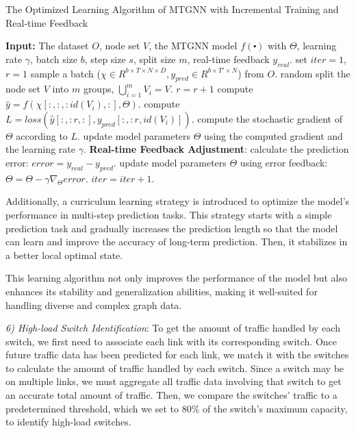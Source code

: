 \documentclass[journal]{IEEEtran}
\begin{document}
\begin{algorithm}
\caption{The Optimized Learning Algorithm of MTGNN with Incremental Training and Real-time Feedback}
\label{alg1}
\begin{algorithmic}[1] 
\small  
\STATE \textbf{Input:} The dataset $O$, node set $V$, the MTGNN model $f\left( \centerdot  \right)$ with $\Theta $, learning rate $\gamma $, batch size $b$, step size $s$, split size $m$, real-time feedback $y_{real}$.
\STATE set $iter=1$, $r=1$
    \STATE sample a batch ($\chi \in {{R}^{b \times T \times N \times D}}, y_{pred} \in {{R}^{b \times T' \times N}}$) from $O$.
    \STATE random split the node set $V$ into $m$ groups, $\bigcup\nolimits_{i=1}^{m}{{{V}_{i}}=V}$.
        \STATE $r = r + 1$
    \ENDIF
        \STATE compute $\hat{y} = f(\chi[:,:,:id({V}_{i}),:], \Theta)$.
        \STATE compute $L = loss(\hat{y}[:, :r, :], y_{pred}[:,:r, id({V}_{i})])$.
        \STATE compute the stochastic gradient of $\Theta$ according to $L$.
        \STATE update model parameters $\Theta$ using the computed gradient and the learning rate $\gamma$.
        \ENDFOR
    \STATE \textbf{Real-time Feedback Adjustment}:  
        \STATE calculate the prediction error: $error = y_{real} - y_{pred}$.
        \STATE update model parameters $\Theta$ using error feedback: $\Theta = \Theta - \gamma \nabla_{\Theta} error$.
    \ENDIF
    \STATE $iter = iter + 1$.
\ENDWHILE
\end{algorithmic}
\end{algorithm}


Additionally, a curriculum learning strategy is introduced to optimize the model's performance in multi-step prediction tasks. This strategy starts with a simple prediction task and gradually increases the prediction length so that the model can learn and improve the accuracy of long-term prediction. Then, it stabilizes in a better local optimal state. 

This learning algorithm not only improves the performance of the model but also enhances its stability and generalization abilities, making it well-suited for handling diverse and complex graph data.



\emph{6) High-load Switch Identification}: To get the amount of traffic handled by each switch, we first need to associate each link with its corresponding switch.       
Once future traffic data has been predicted for each link, we match it with the switches to calculate the amount of traffic handled by each switch.       
Since a switch may be on multiple links, we must aggregate all traffic data involving that switch to get an accurate total amount of traffic.       
Then, we compare the switches' traffic to a predetermined threshold, which we set to 80\% of the switch's maximum capacity, to identify high-load switches.  
\end{document}
